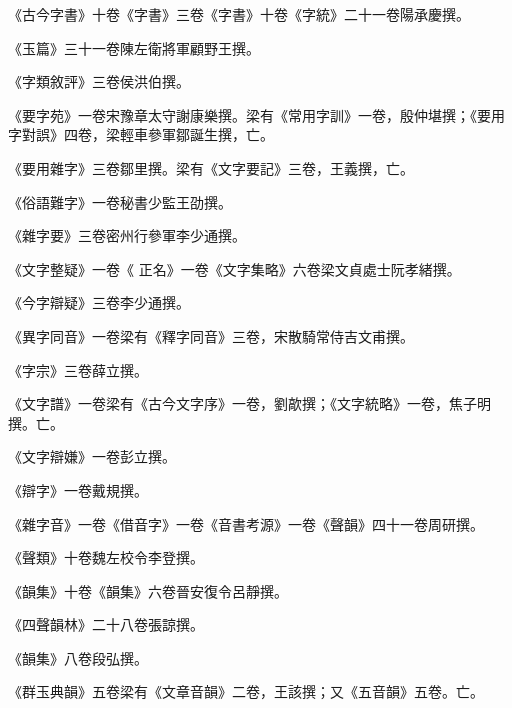 \begin{pinyinscope}
 《古今字書》十卷《字書》三卷《字書》十卷《字統》二十一卷陽承慶撰。



 《玉篇》三十一卷陳左衛將軍顧野王撰。



 《字類敘評》三卷侯洪伯撰。



 《要字苑》一卷宋豫章太守謝康樂撰。梁有《常用字訓》一卷，殷仲堪撰；《要用字對誤》四卷，梁輕車參軍鄒誕生撰，亡。



 《要用雜字》三卷鄒里撰。梁有《文字要記》三卷，王義撰，亡。



 《俗語難字》一卷秘書少監王劭撰。



 《雜字要》三卷密州行參軍李少通撰。



 《文字整疑》一卷《
 正名》一卷《文字集略》六卷梁文貞處士阮孝緒撰。



 《今字辯疑》三卷李少通撰。



 《異字同音》一卷梁有《釋字同音》三卷，宋散騎常侍吉文甫撰。



 《字宗》三卷薛立撰。



 《文字譜》一卷梁有《古今文字序》一卷，劉歊撰；《文字統略》一卷，焦子明撰。亡。



 《文字辯嫌》一卷彭立撰。



 《辯字》一卷戴規撰。



 《雜字音》一卷《借音字》一卷《音書考源》一卷《聲韻》四十一卷周研撰。



 《聲類》十卷魏左校令李登撰。



 《韻集》十卷《韻集》六卷晉安復令呂靜撰。



 《四聲韻林》二十八卷張諒撰。



 《韻集》八卷段弘撰。



 《群玉典韻》五卷梁有《文章音韻》二卷，王該撰；又《五音韻》五卷。亡。




\end{pinyinscope}
